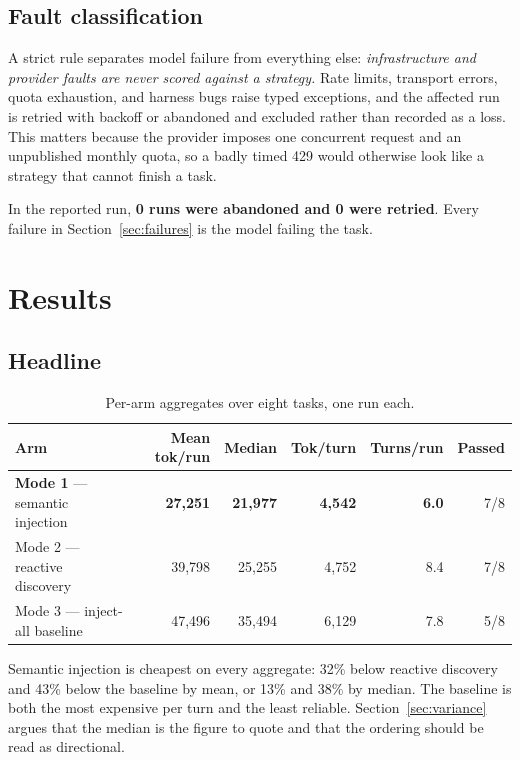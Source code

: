 \documentclass[11pt,a4paper]{article}
\begin{document}
\subsection{Fault classification}

A strict rule separates model failure from everything else: \emph{infrastructure and provider faults
are never scored against a strategy.} Rate limits, transport errors, quota exhaustion, and harness
bugs raise typed exceptions, and the affected run is retried with backoff or abandoned and excluded
rather than recorded as a loss. This matters because the provider imposes one concurrent request and
an unpublished monthly quota, so a badly timed 429 would otherwise look like a strategy that cannot
finish a task.

In the reported run, \textbf{0 runs were abandoned and 0 were retried}. Every failure in
Section~\ref{sec:failures} is the model failing the task.

\section{Results}

\subsection{Headline}

\begin{table}[h]
\centering
\small
\begin{tabular}{@{}lrrrrr@{}}
\toprule
\textbf{Arm} & \textbf{Mean tok/run} & \textbf{Median} & \textbf{Tok/turn} & \textbf{Turns/run} & \textbf{Passed} \\
\midrule
\textbf{Mode 1} --- semantic injection & \textbf{27,251} & \textbf{21,977} & \textbf{4,542} & \textbf{6.0} & 7/8 \\
Mode 2 --- reactive discovery          & 39,798 & 25,255 & 4,752 & 8.4 & 7/8 \\
Mode 3 --- inject-all baseline         & 47,496 & 35,494 & 6,129 & 7.8 & 5/8 \\
\bottomrule
\end{tabular}
\caption{Per-arm aggregates over eight tasks, one run each.}
\label{tab:headline}
\end{table}

Semantic injection is cheapest on every aggregate: 32\% below reactive discovery and 43\% below the
baseline by mean, or 13\% and 38\% by median. The baseline is both the most expensive per turn and
the least reliable. Section~\ref{sec:variance} argues that the median is the figure to quote and that
the ordering should be read as directional.
\end{document}
